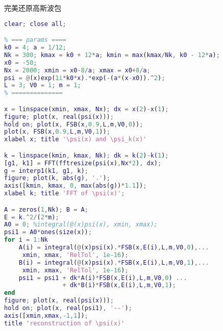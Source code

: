 
\begin{issues}
\issueDraft
\end{issues}

完美还原高斯波包
\begin{lstlisting}[language=matlab, caption=FSBsct.m]
clear; close all;

% === params ====
k0 = 4; a = 1/12;
Nk = 300; kmax = k0 + 12*a; kmin = max(kmax/Nk, k0 - 12*a);
x0 = -50;
Nx = 2000; xmin = x0-8/a; xmax = x0+8/a;
psi = @(x)exp(1i*k0*x).*exp(-(a*(x-x0)).^2);
L = 3; V0 = 1; m = 1;
% ==============

x = linspace(xmin, xmax, Nx); dx = x(2)-x(1);
figure; plot(x, real(psi(x)));
hold on; plot(x, FSB(x,0.9,L,m,V0,0));
plot(x, FSB(x,0.9,L,m,V0,1));
xlabel x; title '\psi(x) and \psi_k(x)'

k = linspace(kmin, kmax, Nk); dk = k(2)-k(1);
[g1, k1] = FFT(fftresize(psi(x),Nx*2), dx);
g = interp1(k1, g1, k);
figure; plot(k, abs(g), '.');
axis([kmin, kmax, 0, max(abs(g))*1.1]);
xlabel k; title 'FFT of \psi(x)';

A = zeros(1,Nk); B = A;
E = k.^2/(2*m);
A0 = 0; %integral(@(x)psi(x), xmin, xmax);
psi1 = A0*ones(size(x));
for i = 1:Nk
    A(i) = integral(@(x)psi(x).*FSB(x,E(i),L,m,V0,0),...
     xmin, xmax, 'RelTol', 1e-16);
    B(i) = integral(@(x)psi(x).*FSB(x,E(i),L,m,V0,1),...
     xmin, xmax, 'RelTol', 1e-16);
    psi1 = psi1 + dk*A(i)*FSB(x,E(i),L,m,V0,0) ...
                + dk*B(i)*FSB(x,E(i),L,m,V0,1);
end
figure; plot(x, real(psi(x)));
hold on; plot(x, real(psi1), '--');
axis([xmin,xmax,-1,1]);
title 'reconstruction of \psi(x)'
\end{lstlisting}
